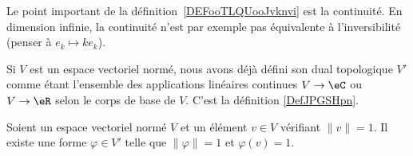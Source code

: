 Le point important de la définition~\ref{DEFooTLQUooJvknvi} est la continuité. En dimension infinie, la continuité n'est par exemple pas équivalente à l'inversibilité (penser à \( e_k\mapsto ke_k\)).

Si \( V\) est un espace vectoriel normé, nous avons déjà défini son dual topologique \( V'\) comme étant l'ensemble des applications linéaires continues \( V\to \eC\) ou \( V\to \eR\) selon le corps de base de \( V\). C'est la définition \ref{DefJPGSHpn}.

\begin{proposition}
	Soient un espace vectoriel normé \( V\) et un élément \( v\in V\) vérifiant \( \| v \|=1\). Il existe une forme \( \varphi\in V'\) telle que \( \| \varphi \|=1\) et \( \varphi(v)=1\).
\end{proposition}

